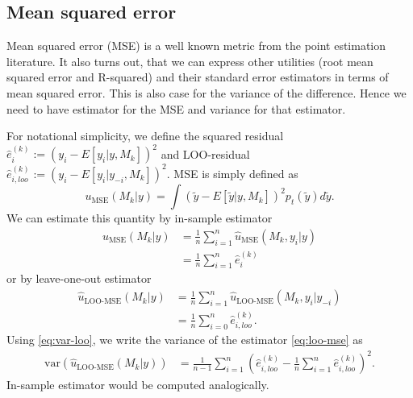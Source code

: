 \documentclass{article}
\newcommand{\residual}[2][i]{\hat{e}_{#1}^{(#2)}}
\begin{document}

\subsection{Mean squared error}
Mean squared error (MSE) is a well known metric from the point estimation literature. It also turns out, that we can express other utilities (root mean squared error and R-squared) and their standard error estimators in terms of mean squared error. This is also case for the variance of the difference. Hence we need to have estimator for the MSE and variance for that estimator.

For notational simplicity, we define the squared residual $\residual{k} := (y_i - E[y_i | y, M_k])^2$ and LOO-residual $\residual[i, loo]{k} := (y_i - E[y_i | y_{-i}, M_k])^2$. MSE is simply defined as
\begin{equation}
    u_{\text{MSE}}(M_k | y) = \int \left( \tilde{y} - E\left[ \tilde{y} | y, M_k \right] \right)^2 p_t(\tilde{y}) d\tilde{y}.
\end{equation}
We can estimate this quantity by in-sample estimator
\begin{align}
    \hat{u}_{\text{MSE}}(M_k | y) &= \frac{1}{n} \sum_{i=1}^n \hat{u}_{\text{MSE}}(M_k, y_i | y) \nonumber \\ 
    &= \frac{1}{n} \sum_{i=1}^n \residual{k}
\end{align}
or by leave-one-out estimator
\begin{align}
    \hat{u}_{\text{LOO-MSE}}(M_k | y) &=\frac{1}{n} \sum_{i=1}^n \hat{u}_{\text{LOO-MSE}}(M_k, y_i | y_{-i}) \nonumber \\
    &=\frac{1}{n} \sum_{i=0}^n \residual[i,loo]{k}. \label{eq:loo-mse}
\end{align}
Using \eqref{eq:var-loo}, we write the variance of the estimator \eqref{eq:loo-mse} as
\begin{align}
    \widehat{\text{var}}\left( \hat{u}_{\text{LOO-MSE}}(M_k | y) \right) &= \frac{1}{n-1} \sum_{i = 1}^n \left( \residual[i, loo]{k} -  \frac{1}{n} \sum_{i=1}^n \residual[i, loo]{k} \right)^2 \label{eq:var-loo-mse}.
\end{align}
In-sample estimator would be computed analogically. 
\end{document}
